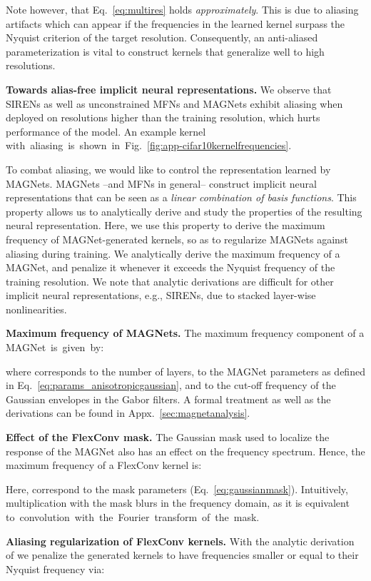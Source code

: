 \documentclass{article} \usepackage{iclr2022_conference,times}
\begin{document}
Note however, that Eq.~\ref{eq:multires} holds \textit{approximately}. This is due to aliasing artifacts which can appear if the frequencies in the learned kernel surpass the Nyquist criterion of the target resolution. Consequently, an anti-aliased parameterization is vital to construct kernels that generalize well to high resolutions.

\textbf{Towards alias-free implicit neural representations.} We observe that SIRENs as well as unconstrained MFNs and MAGNets exhibit aliasing when deployed on resolutions higher than the training resolution, which hurts performance of the model. An example kernel with~aliasing~is~shown~in~Fig.~\ref{fig:app-cifar10kernelfrequencies}.


To combat aliasing, we would like to control the representation learned by MAGNets. MAGNets --and MFNs in general-- construct implicit neural representations that can be seen as a \textit{linear combination of basis functions}. This property allows us to analytically derive and study the properties of the resulting neural representation. Here, we use this property to derive the maximum frequency of MAGNet-generated kernels, so as to regularize MAGNets against aliasing during training. We analytically derive the maximum frequency of a MAGNet, and penalize it whenever it exceeds the Nyquist frequency of the training resolution. We note that analytic derivations are difficult for other implicit neural representations, e.g., SIRENs, due to stacked layer-wise nonlinearities. 

\textbf{Maximum frequency of MAGNets.}
The maximum frequency component of a MAGNet~is~given~by:

where  corresponds to the number of layers,  to the MAGNet parameters as defined in Eq.~\ref{eq:params_anisotropicgaussian}, and  to the cut-off frequency of the Gaussian envelopes in the Gabor filters. A formal treatment as well as the derivations can be found in Appx.~\ref{sec:magnetanalysis}.


\textbf{Effect of the FlexConv mask.} The Gaussian mask used to localize the response of the MAGNet 
also has an effect on the frequency spectrum. Hence, the maximum frequency of a FlexConv kernel is:

Here,  correspond to the mask parameters (Eq.~\ref{eq:gaussianmask}). Intuitively, multiplication with the mask blurs in the frequency domain, as it is equivalent to~convolution~with~the~Fourier~transform~of~the~mask.

\textbf{Aliasing regularization of FlexConv kernels.} With the analytic derivation of  we penalize the generated kernels to have frequencies smaller or equal to their Nyquist frequency  via:
\end{document}
